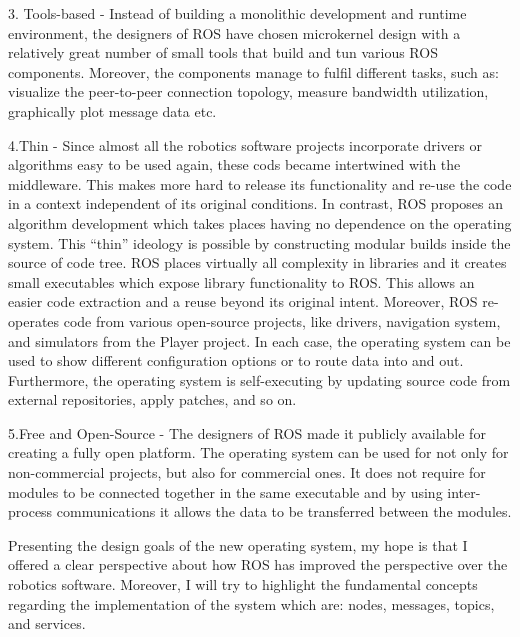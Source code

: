 3. Tools-based - Instead of building a monolithic development and runtime environment, the designers of ROS have chosen  microkernel design with a relatively great number of small tools that build and tun various ROS components. Moreover, the components manage to fulfil different tasks, such as: visualize the peer-to-peer connection topology, measure bandwidth utilization, graphically plot message data etc. 

4.Thin - Since almost all the robotics software projects incorporate drivers or algorithms easy to be used again, these cods became intertwined with the middleware. This makes more hard to release its functionality and re-use the code in a context independent of its original conditions. In contrast, ROS proposes an algorithm development which takes places having no dependence on the operating system. This “thin” ideology is possible by constructing modular builds inside the source of code tree. ROS places virtually all complexity in libraries and it creates small executables which expose library functionality to ROS. This allows an easier code extraction and a reuse beyond its original intent. 
	Moreover, ROS re-operates code from various open-source projects, like drivers, navigation system, and simulators from the Player project. In each case, the operating system can be used to show different configuration options or to route data into and out. Furthermore, the operating system is self-executing by updating source code from external repositories, apply patches, and so on.

5.Free and Open-Source - The designers of ROS made it publicly available for creating a fully open platform. The operating system can be used for not only for non-commercial projects, but also for commercial ones. It does not require for modules to be connected together in the same executable and by using inter-process communications it  allows the data to be transferred between the modules. 

Presenting the design goals of the new operating system, my hope is that I offered a clear perspective about how ROS has improved the perspective over the robotics software. Moreover, I will try to highlight the fundamental concepts regarding the implementation of the system which are: nodes, messages, topics, and services. 

